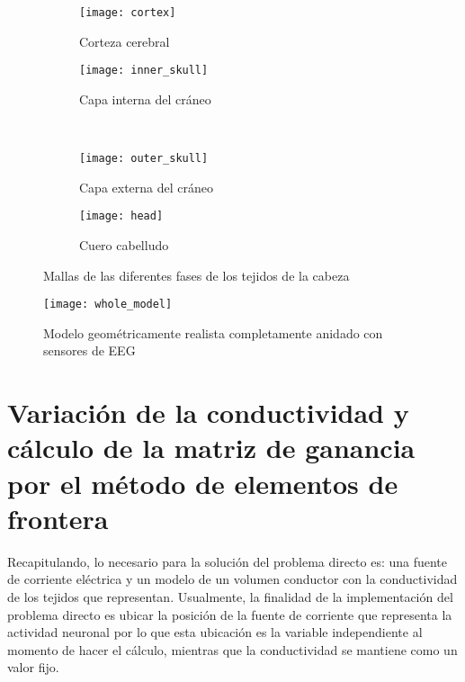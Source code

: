 \begin{figure}[tb]
	\centering
	\begin{subfigure}{0.45\textwidth}
		\texttt{[image: cortex]}
		\caption{Corteza cerebral}
		\label{fig:methodology:cortex}
		\vspace{0.1cm}
	\end{subfigure}\hfill
	\begin{subfigure}{0.45\textwidth}
		\texttt{[image: inner\_skull]}
		\caption{Capa interna del cráneo}
		\label{fig:methodology:inner}
		\vspace{0.1cm}
	\end{subfigure}\\
	\begin{subfigure}{0.45\textwidth}
		\texttt{[image: outer\_skull]}
		\caption{Capa externa del cráneo}
		\label{fig:methodology:outer}
	\end{subfigure}\hfill
	\begin{subfigure}{0.45\textwidth}
		\texttt{[image: head]}
		\caption{Cuero cabelludo}
		\label{fig:methodology:head}
	\end{subfigure}
	\caption{Mallas de las diferentes fases de los tejidos de la cabeza}
	\label{fig:methodology:meshes}
\end{figure}

\begin{figure}[htb]
	\texttt{[image: whole\_model]}
	\caption{Modelo geométricamente realista completamente anidado con sensores de EEG}
	\label{fig:methodology:model}
\end{figure}


\section{Variación de la conductividad y cálculo de la matriz de ganancia por el método de elementos de frontera}
\label{sec:methodology:openmeeg}

Recapitulando, lo necesario para la solución del problema directo es: una fuente de corriente eléctrica y un modelo de un volumen conductor con la conductividad de los tejidos que representan.
Usualmente, la finalidad de la implementación del problema directo es ubicar la posición de la fuente de corriente que representa la actividad neuronal por lo que esta ubicación es la variable independiente al momento de hacer el cálculo, mientras que la conductividad se mantiene como un valor fijo.

